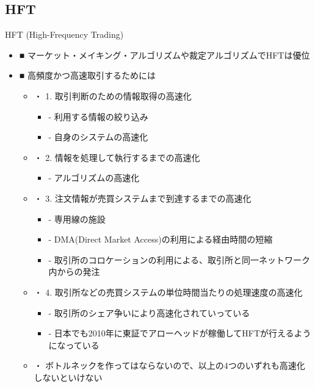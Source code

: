 \documentclass[dvipdfmx, autodetect-engine, aspectratio=169, 10.5pt]{beamer}
\begin{document}
\subsection{HFT}
\begin{frame}{HFT \textnormal{(High-Frequency Trading)}}
	\scriptsize
	\begin{itemize}
		\item ■ マーケット・メイキング・アルゴリズムや裁定アルゴリズムでHFTは優位
		\item ■ 高頻度かつ高速取引するためには
		      \begin{itemize}
			      \item ・ 1. 取引判断のための情報取得の高速化
			            \begin{itemize}
				            \item - 利用する情報の絞り込み
				            \item - 自身のシステムの高速化
			            \end{itemize}
			      \item ・ 2. 情報を処理して執行するまでの高速化
			            \begin{itemize}
				            \item - アルゴリズムの高速化
			            \end{itemize}
			      \item ・ 3. 注文情報が売買システムまで到達するまでの高速化
			            \begin{itemize}
				            \item - 専用線の施設
				            \item - DMA(Direct Market Access)の利用による経由時間の短縮
				            \item - 取引所のコロケーションの利用による、取引所と同一ネットワーク内からの発注
			            \end{itemize}
			      \item ・ 4. 取引所などの売買システムの単位時間当たりの処理速度の高速化
			            \begin{itemize}
				            \item - 取引所のシェア争いにより高速化されていっている
				            \item - 日本でも2010年に東証でアローヘッドが稼働してHFTが行えるようになっている
			            \end{itemize}
			      \item ・ ボトルネックを作ってはならないので、以上の4つのいずれも高速化しないといけない
		      \end{itemize}
	\end{itemize}
\end{frame}
\end{document}
